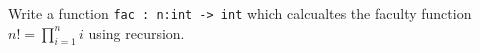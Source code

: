 Write a function \lstinline{fac : n:int -> int} which calcualtes the faculty function $n! = \prod_{i=1}^ni$ using recursion.
